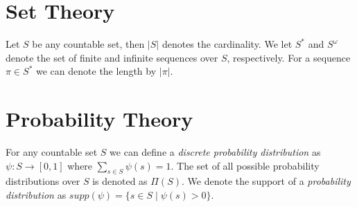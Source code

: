 \section*{Set Theory}
Let $S$ be any countable set, then $|S|$ denotes the cardinality. We let $S^*$ and $S^\omega$ denote the set of finite and infinite sequences over $S$, respectively. For a sequence $\pi\in S^*$ we can denote the length by $|\pi|$.


\section*{Probability Theory}
For any countable set $S$ we can define a \textit{discrete probability distribution} as $\psi: S\to[0,1]$ where $\sum_{s\in S} \psi(s)=1$. The set of all possible probability distributions over $S$ is denoted as $\Pi(S)$. We denote the support of a \textit{probability distribution} as $supp(\psi)=\{s\in S\mid \psi(s)>0\}$.\\





